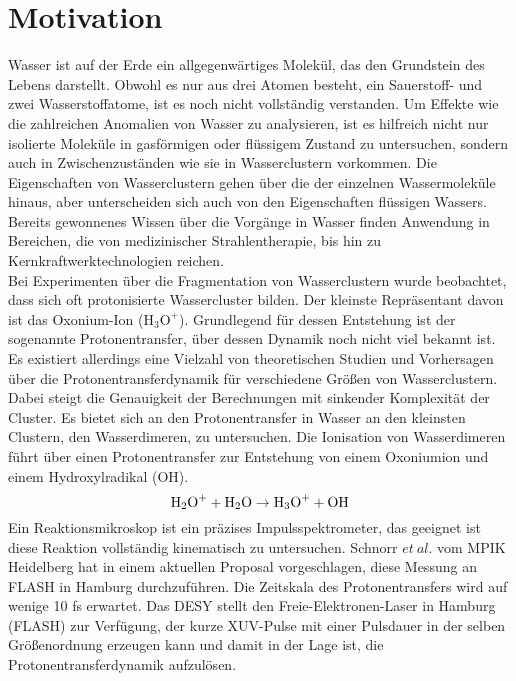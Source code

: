 
  \chapter{Motivation} \label{sec:Motivation}
  
Wasser ist auf der Erde ein allgegenwärtiges Molekül, das den Grundstein des Lebens darstellt.
Obwohl es nur aus drei Atomen besteht, ein Sauerstoff- und zwei Wasserstoffatome, ist es noch nicht vollständig verstanden. Um Effekte wie die zahlreichen Anomalien von Wasser \cite{WAS} zu analysieren, ist es hilfreich nicht nur isolierte Moleküle in gasförmigen oder flüssigem Zustand zu untersuchen, sondern auch in Zwischenzuständen wie sie in Wasserclustern vorkommen. Die Eigenschaften von Wasserclustern gehen über die der einzelnen Wassermoleküle hinaus, aber unterscheiden sich auch von den Eigenschaften flüssigen Wassers. Bereits gewonnenes Wissen über die Vorgänge in Wasser finden Anwendung in Bereichen, die von medizinischer Strahlentherapie, bis hin zu Kernkraftwerktechnologien reichen.\\
Bei Experimenten über die Fragmentation von Wasserclustern wurde beobachtet, dass sich oft protonisierte Wassercluster bilden. Der kleinste Repräsentant davon ist das Oxonium-Ion ($\mathrm{H_3O^+}$). Grundlegend für dessen Entstehung ist der sogenannte Protonentransfer, über dessen Dynamik noch nicht viel bekannt ist. Es existiert allerdings eine Vielzahl von theoretischen Studien und Vorhersagen über die Protonentransferdynamik für verschiedene Größen von Wasserclustern. Dabei steigt die Genauigkeit der Berechnungen mit sinkender Komplexität der Cluster. Es bietet sich an den Protonentransfer in Wasser an den kleinsten Clustern, den Wasserdimeren, zu untersuchen. Die Ionisation von Wasserdimeren führt über einen Protonentransfer zur Entstehung von einem Oxoniumion und einem Hydroxylradikal (OH).
  \begin{equation}
  \textmd{H}_2\textmd{O}^+ + \textmd{H}_2\textmd{O} \rightarrow \textmd{H}_3\textmd{O}^+ + \textmd{O}\textmd{H} 
  \end{equation} 
Ein Reaktionsmikroskop ist ein präzises Impulsspektrometer, das geeignet ist diese Reaktion vollständig kinematisch zu untersuchen. Schnorr $et \ al.$ vom MPIK Heidelberg hat in einem aktuellen Proposal vorgeschlagen, diese Messung an FLASH in Hamburg durchzuführen. Die Zeitskala des Protonentransfers wird auf wenige 10 fs erwartet. Das DESY stellt den Freie-Elektronen-Laser in Hamburg (FLASH) zur Verfügung, der kurze XUV-Pulse mit einer Pulsdauer in der selben Größenordnung erzeugen kann und damit in der Lage ist, die Protonentransferdynamik aufzulösen. \\

